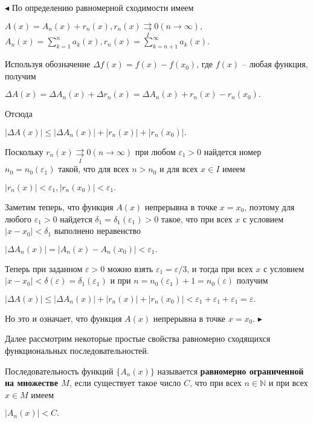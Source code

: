 $\blacktriangleleft$ По определению равномерной сходимости имеем
\begin{center}$A(x)=A_n(x)+r_n(x), r_n(x)\mathop{\rightrightarrows}\limits_{I}0 (n\to \infty),$ $A_n(x)= \sum^{n}_{k=1}a_k(x), r_n(x)=\sum^{\infty}_{k=n+1}a_k(x).$
\end{center}
Используя обозначение $\Delta f(x)=f(x)-f(x_0)$, где $f(x)$ -- любая функция, получим
\begin{center}$\Delta A(x)=\Delta A_n(x)+\Delta r_n(x)=\Delta A_n(x)+ r_n(x)-r_n(x_0).$
\end{center}
Отсюда
\begin{center}$|\Delta A(x)|\le |\Delta A_n(x)|+|r_n(x)|+|r_n(x_0)|.$
\end{center}
Поскольку $r_n(x)\mathop{\rightrightarrows}\limits_{I}0 (n\to \infty)$ при любом 
$ \varepsilon_1>0 $
найдется номер $n_0=n_0(\varepsilon_1)$ такой, что для всех $n>n_0$ и для всех $x \in I$ имеем
\begin{center}$|r_n(x)|<\varepsilon_1, |r_n(x_0)|<\varepsilon_1.$
\end{center}
Заметим теперь, что функция $A(x)$ непрерывна в точке $x=x_0$, поэтому для любого $ \varepsilon_1>0 $ найдется $\delta_1=\delta_1(\varepsilon_1)>0$ такое, что при всех $x$ с условием $|x-x_0|<\delta_1$ выполнено неравенство
\begin{center}$|\Delta A_n(x)|=|A_n(x)-A_n(x_0)|<\varepsilon_1.$
\end{center}
Теперь при заданном $\varepsilon>0$ можно взять $\varepsilon_1=\varepsilon/3$, и тогда при всех $x$ с условием $|x-x_0|<\delta(\varepsilon)=\delta_1(\varepsilon_1)$ и при $n=n_0(\varepsilon_1)+1=n_0(\varepsilon)$ получим
\begin{center}$|\Delta A(x)|\le |\Delta A_n(x)|+|r_n(x)|+|r_n(x_0)|<\varepsilon_1+\varepsilon_1+\varepsilon_1=\varepsilon.$
\end{center}
Но это и означает, что функция $A(x)$ непрерывна в точке $x=x_0$. $\blacktriangleright$

Далее рассмотрим некоторые простые свойства равномерно сходящихся функциональных последовательностей.\smallskip

\begin{object} Последовательность функций $\{ A_n(x)\}$ называется \textbf{равномерно ограниченной на множестве $M$}, если существует такое число $C$, что при всех $n\in \mathbb{N}$ и при всех $x \in M$ имеем
\begin{center}$|A_n(x)|<C.$\end{center}\end{object}

